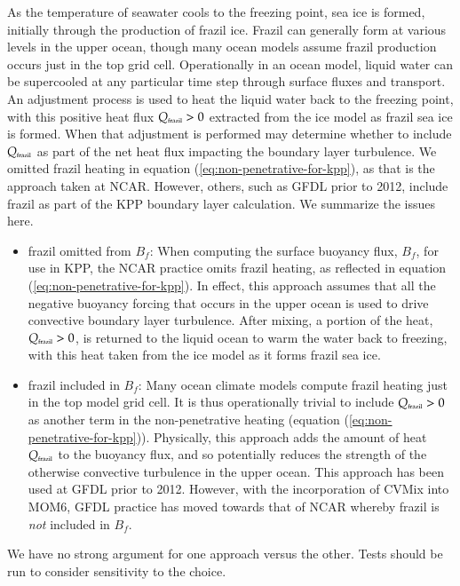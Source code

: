 As the temperature of seawater cools to the freezing point, sea ice is
formed, initially through the production of frazil ice.  Frazil can
generally form at various levels in the upper ocean, though many ocean
models assume frazil production occurs just in the top grid cell.
Operationally in an ocean model, liquid water can be supercooled at
any particular time step through surface fluxes and transport.  An
adjustment process is used to heat the liquid water back to the
freezing point, with this positive heat flux $Q_{\mbox{\tiny frazil}}
> 0$ extracted from the ice model as frazil sea ice is formed.  When
that adjustment is performed may determine whether to include
$Q_{\mbox{\tiny frazil}}$ as part of the net heat flux impacting the
boundary layer turbulence.  We omitted frazil heating in equation
(\ref{eq:non-penetrative-for-kpp}), as that is the approach taken at
NCAR. However, others, such as GFDL prior to 2012, include frazil as
part of the KPP boundary layer calculation.  We summarize the issues
here.

\begin{itemize}

\item {\sc frazil omitted from $B_{f}$}: When computing the surface
  buoyancy flux, $B_{f}$, for use in KPP, the NCAR practice omits
  frazil heating, as reflected in equation
  (\ref{eq:non-penetrative-for-kpp}).  In effect, this approach
  assumes that all the negative buoyancy forcing that occurs in the
  upper ocean is used to drive convective boundary layer
  turbulence. After mixing, a portion of the heat, $Q_{\mbox{\tiny
      frazil}} > 0$, is returned to the liquid ocean to warm the water
  back to freezing, with this heat taken from the ice model as it
  forms frazil sea ice.

\item {\sc frazil included in $B_{f}$}: Many ocean climate models
  compute frazil heating just in the top model grid cell.  It is thus
  operationally trivial to include $Q_{\mbox{\tiny frazil}} > 0$ as
  another term in the non-penetrative heating (equation
  (\ref{eq:non-penetrative-for-kpp})).  Physically, this approach adds
  the amount of heat $Q_{\mbox{\tiny frazil}}$ to the buoyancy flux,
  and so potentially reduces the strength of the otherwise convective
  turbulence in the upper ocean.  This approach has been used at GFDL
  prior to 2012.  However, with the incorporation of CVMix into MOM6,
  GFDL practice has moved towards that of NCAR whereby frazil is {\it
    not} included in $B_{f}$.

\end{itemize}
We have no strong argument for one approach versus the other.  Tests
should be run to consider sensitivity to the choice.



